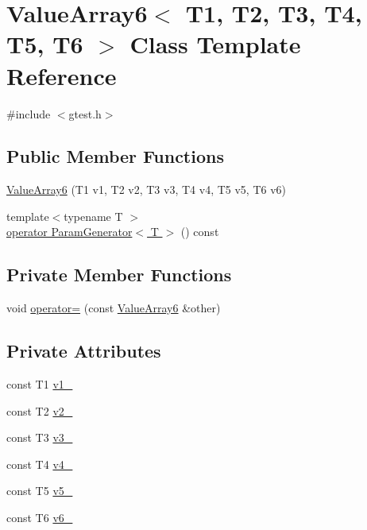 \hypertarget{classtesting_1_1internal_1_1ValueArray6}{\section{\-Value\-Array6$<$ \-T1, \-T2, \-T3, \-T4, \-T5, \-T6 $>$ \-Class \-Template \-Reference}
\label{d3/da9/classtesting_1_1internal_1_1ValueArray6}
}


{\ttfamily \#include $<$gtest.\-h$>$}

\subsection*{\-Public \-Member \-Functions}
\begin{DoxyCompactItemize}
\item 
\hyperlink{classtesting_1_1internal_1_1ValueArray6_a3c831f765cdeb51d3cd602483a604740}{\-Value\-Array6} (\-T1 v1, \-T2 v2, \-T3 v3, \-T4 v4, \-T5 v5, \-T6 v6)
\item 
{\footnotesize template$<$typename T $>$ }\\\hyperlink{classtesting_1_1internal_1_1ValueArray6_a08ef46fa12c9dd8ef6fc630baeea89b7}{operator Param\-Generator$<$ T $>$} () const 
\end{DoxyCompactItemize}
\subsection*{\-Private \-Member \-Functions}
\begin{DoxyCompactItemize}
\item 
void \hyperlink{classtesting_1_1internal_1_1ValueArray6_a273ee767a6b0f5798526cdd63543dc59}{operator=} (const \hyperlink{classtesting_1_1internal_1_1ValueArray6}{\-Value\-Array6} \&other)
\end{DoxyCompactItemize}
\subsection*{\-Private \-Attributes}
\begin{DoxyCompactItemize}
\item 
const \-T1 \hyperlink{classtesting_1_1internal_1_1ValueArray6_aac1d0654cc6c1aceb4a5d0fa7a98042e}{v1\-\_\-}
\item 
const \-T2 \hyperlink{classtesting_1_1internal_1_1ValueArray6_a9f0a8ce6ce2fd27e980c4c51a7a7256a}{v2\-\_\-}
\item 
const \-T3 \hyperlink{classtesting_1_1internal_1_1ValueArray6_a4f8257321a2eab0456239174d6712d5e}{v3\-\_\-}
\item 
const \-T4 \hyperlink{classtesting_1_1internal_1_1ValueArray6_aac184059fee257381ccae81d8d112f85}{v4\-\_\-}
\item 
const \-T5 \hyperlink{classtesting_1_1internal_1_1ValueArray6_a1f3e0ada8419ed2e17cc61e6c0c54404}{v5\-\_\-}
\item 
const \-T6 \hyperlink{classtesting_1_1internal_1_1ValueArray6_a13d84d5824617bbc6fb1a6b3ee3cb745}{v6\-\_\-}
\end{DoxyCompactItemize}


